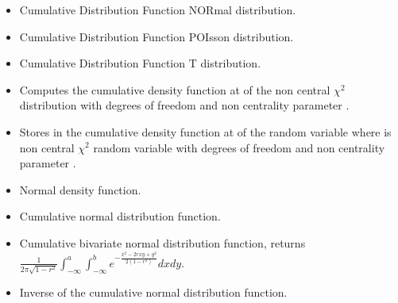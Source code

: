 \begin{itemize}
\item {}
  \sshortdescribe Cumulative Distribution Function NORmal distribution.  

\item {}
  \sshortdescribe Cumulative Distribution Function POIsson distribution.  

\item {}
  \sshortdescribe Cumulative Distribution Function T distribution.  

\item {}
  \sshortdescribe Computes the cumulative density function at  of the
  non central $\chi^2$ distribution with  degrees of freedom and non
  centrality parameter .

\item {}
  \sshortdescribe Stores in  the cumulative density function at 
  of the random variable  where  is non central $\chi^2$
  random variable with  degrees of freedom and non
  centrality parameter .


\item {}
  \sshortdescribe Normal density function.

\item {}
  \sshortdescribe Cumulative normal distribution function.

\item {}
  \sshortdescribe Cumulative bivariate normal distribution function, returns
  $\frac{1} {2\pi \sqrt{1-r^2}} \int_{- \infty}^a\int_{- \infty}^b e^{-
    \frac{x^2 - 2 r xy+y^2} {2(1-r^2)} } dxdy.$
  
\item {}
  \sshortdescribe Inverse of the cumulative normal distribution function.
\end{itemize}


